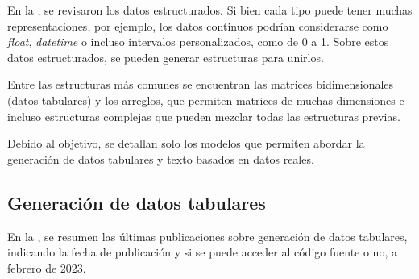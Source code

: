 En la , se revisaron los datos estructurados. Si bien cada tipo puede tener muchas representaciones, por ejemplo, los datos continuos podrían considerarse como \emph{float}, \emph{datetime} o incluso intervalos personalizados, como de 0 a 1. Sobre estos datos estructurados, se pueden generar estructuras para unirlos.

Entre las estructuras más comunes se encuentran las matrices bidimensionales (datos tabulares) y los arreglos, que permiten matrices de muchas dimensiones e incluso estructuras complejas que pueden mezclar todas las estructuras previas.

Debido al objetivo, se detallan solo los modelos que permiten abordar la generación de datos tabulares y texto basados en datos reales.

\subsection{Generación de datos tabulares}
En la , se resumen las últimas publicaciones sobre generación de datos tabulares, indicando la fecha de publicación y si se puede acceder al código fuente o no, a febrero de 2023.


